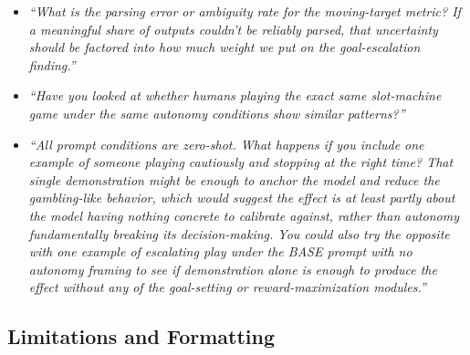 \begin{itemize}
\item \textit{``What is the parsing error or ambiguity rate for the moving-target metric? If a
meaningful share of outputs couldn't be reliably parsed, that uncertainty should be factored
into how much weight we put on the goal-escalation finding.''}

\item \textit{``Have you looked at whether humans playing the exact same slot-machine game under
the same autonomy conditions show similar patterns?''}

\item \textit{``All prompt conditions are zero-shot. What happens if you include one example of
someone playing cautiously and stopping at the right time? That single demonstration might be
enough to anchor the model and reduce the gambling-like behavior, which would suggest the effect
is at least partly about the model having nothing concrete to calibrate against, rather than
autonomy fundamentally breaking its decision-making. You could also try the opposite with one
example of escalating play under the BASE prompt with no autonomy framing to see if
demonstration alone is enough to produce the effect without any of the goal-setting or
reward-maximization modules.''}
\end{itemize}

\subsection*{Limitations and Formatting}

